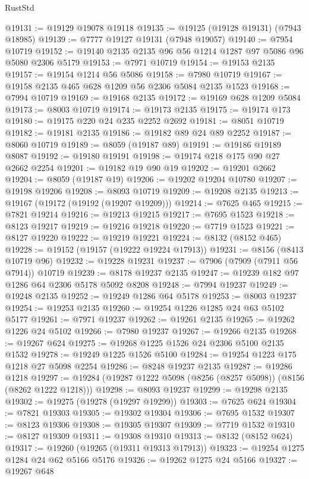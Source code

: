 \begin{lexlean}{RustStd}
\begin{coremodule}
@19131 := @19129 @19078 @19118
@19135 := @19125 (@19128 @19131) (@7943 @18985)
@19139 := @7777 @19127 @19131 (@7948 @19057)
@19140 := @7954 @10719
@19152 := @19140 @2135 @2135 @96 @56 @1214 @1287 @97 @5086 @96 @5080 @2306 @5179
@19153 := @7971 @10719
@19154 := @19153 @2135
@19157 := @19154 @1214 @56 @5086
@19158 := @7980 @10719
@19167 := @19158 @2135 @465 @628 @1209 @56 @2306 @5084 @2135 @1523
@19168 := @7994 @10719
@19169 := @19168 @2135
@19172 := @19169 @628 @1209 @5084
@19173 := @8003 @10719
@19174 := @19173 @2135
@19175 := @19174 @173
@19180 := @19175 @220 @24 @235 @2252 @2692
@19181 := @8051 @10719
@19182 := @19181 @2135
@19186 := @19182 @89 @24 @89 @2252
@19187 := @8060 @10719
@19189 := @8059 (@19187 @89)
@19191 := @19186 @19189 @8087
@19192 := @19180 @19191
@19198 := @19174 @218 @175 @90 @27 @2662 @2254
@19201 := @19182 @19 @90 @19
@19202 := @19201 @2662
@19204 := @8059 (@19187 @19)
@19206 := @19202 @19204 @10780
@19207 := @19198 @19206
@19208 := @8093 @10719
@19209 := @19208 @2135
@19213 := @19167 (@19172 (@19192 (@19207 @19209)))
@19214 := @7625 @465
@19215 := @7821 @19214
@19216 := @19213 @19215
@19217 := @7695 @1523
@19218 := @8123 @19217
@19219 := @19216 @19218
@19220 := @7719 @1523
@19221 := @8127 @19220
@19222 := @19219 @19221
@19224 := @8132 (@8152 @465)
@19228 := @19152 (@19157 (@19222 @19224 @17913))
@19231 := @8156 (@8413 @10719 @96)
@19232 := @19228 @19231
@19237 := @7906 (@7909 (@7911 @56 @7914)) @10719
@19239 := @8178 @19237 @2135
@19247 := @19239 @182 @97 @1286 @64 @2306 @5178 @5092 @8208
@19248 := @7994 @19237
@19249 := @19248 @2135
@19252 := @19249 @1286 @64 @5178
@19253 := @8003 @19237
@19254 := @19253 @2135
@19260 := @19254 @1226 @1285 @24 @63 @5102 @5177
@19261 := @7971 @19237
@19262 := @19261 @2135
@19265 := @19262 @1226 @24 @5102
@19266 := @7980 @19237
@19267 := @19266 @2135
@19268 := @19267 @624
@19275 := @19268 @1225 @1526 @24 @2306 @5100 @2135 @1532
@19278 := @19249 @1225 @1526 @5100
@19284 := @19254 @1223 @175 @1218 @27 @5098 @2254
@19286 := @8248 @19237 @2135
@19287 := @19286 @1218
@19297 := @19284 (@19287 @1222 @5098 (@8256 (@8257 @5098)) (@8156 (@8262 @1222 @1218)))
@19298 := @8093 @19237
@19299 := @19298 @2135
@19302 := @19275 (@19278 (@19297 @19299))
@19303 := @7625 @624
@19304 := @7821 @19303
@19305 := @19302 @19304
@19306 := @7695 @1532
@19307 := @8123 @19306
@19308 := @19305 @19307
@19309 := @7719 @1532
@19310 := @8127 @19309
@19311 := @19308 @19310
@19313 := @8132 (@8152 @624)
@19317 := @19260 (@19265 (@19311 @19313 @17913))
@19323 := @19254 @1275 @1284 @24 @62 @5166 @5176
@19326 := @19262 @1275 @24 @5166
@19327 := @19267 @648

\end{coremodule}
\end{lexlean}
